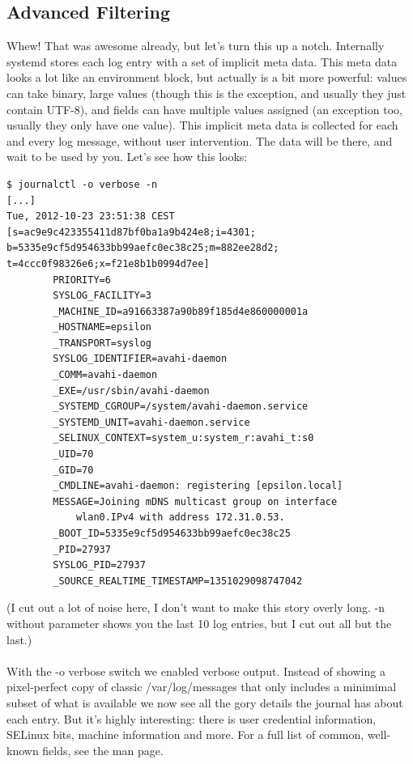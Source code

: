 \documentclass[titlepage]{article}
\begin{document}
\subsection{Advanced Filtering}
Whew! That was awesome already, but let's turn this up a notch. Internally systemd stores each log entry with a set of implicit meta data. This meta data looks a lot like an environment block, but actually is a bit more powerful: values can take binary, large values (though this is the exception, and usually they just contain UTF-8), and fields can have multiple values assigned (an exception too, usually they only have one value). This implicit meta data is collected for each and every log message, without user intervention. The data will be there, and wait to be used by you. Let's see how this looks:
\begin{lstlisting}
$ journalctl -o verbose -n
[...]
Tue, 2012-10-23 23:51:38 CEST 
[s=ac9e9c423355411d87bf0ba1a9b424e8;i=4301;
b=5335e9cf5d954633bb99aefc0ec38c25;m=882ee28d2;
t=4ccc0f98326e6;x=f21e8b1b0994d7ee]
        PRIORITY=6
        SYSLOG_FACILITY=3
        _MACHINE_ID=a91663387a90b89f185d4e860000001a
        _HOSTNAME=epsilon
        _TRANSPORT=syslog
        SYSLOG_IDENTIFIER=avahi-daemon
        _COMM=avahi-daemon
        _EXE=/usr/sbin/avahi-daemon
        _SYSTEMD_CGROUP=/system/avahi-daemon.service
        _SYSTEMD_UNIT=avahi-daemon.service
        _SELINUX_CONTEXT=system_u:system_r:avahi_t:s0
        _UID=70
        _GID=70
        _CMDLINE=avahi-daemon: registering [epsilon.local]
        MESSAGE=Joining mDNS multicast group on interface 
            wlan0.IPv4 with address 172.31.0.53.
        _BOOT_ID=5335e9cf5d954633bb99aefc0ec38c25
        _PID=27937
        SYSLOG_PID=27937
        _SOURCE_REALTIME_TIMESTAMP=1351029098747042
\end{lstlisting}
(I cut out a lot of noise here, I don't want to make this story overly long. -n without parameter shows you the last 10 log entries, but I cut out all but the last.)
\\
\\
With the -o verbose switch we enabled verbose output. Instead of showing a pixel-perfect copy of classic /var/log/messages that only includes a minimimal subset of what is available we now see all the gory details the journal has about each entry. But it's highly interesting: there is user credential information, SELinux bits, machine information and more. For a full list of common, well-known fields, see the man page.
\\
\\
\end{document}
